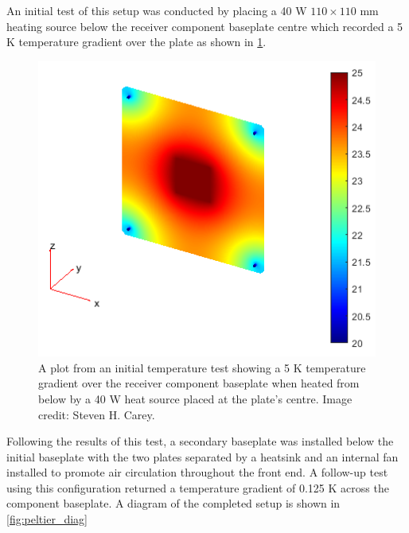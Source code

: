 An initial test of this setup was conducted by placing a 40 W $110 \times 110$ mm heating source below the receiver component baseplate centre which recorded a 5 K temperature gradient over the plate as shown in \cref{fig:base_temp_grad}.
\begin{figure}
    \centering
    \includegraphics[scale=0.6]{base_temp_grad}
    \caption{A plot from an initial temperature test showing a 5 K temperature gradient over the receiver component baseplate when heated from below by a 40 W heat source placed at the plate's centre. Image credit: Steven H. Carey.}
    \label{fig:base_temp_grad}
\end{figure}
Following the results of this test, a secondary baseplate was installed below the initial baseplate with the two plates separated by a heatsink and an internal fan installed to promote air circulation throughout the front end. A follow-up test using this configuration returned a temperature gradient of 0.125 K across the component baseplate. A diagram of the completed setup is shown in \cref{fig:peltier_diag}
